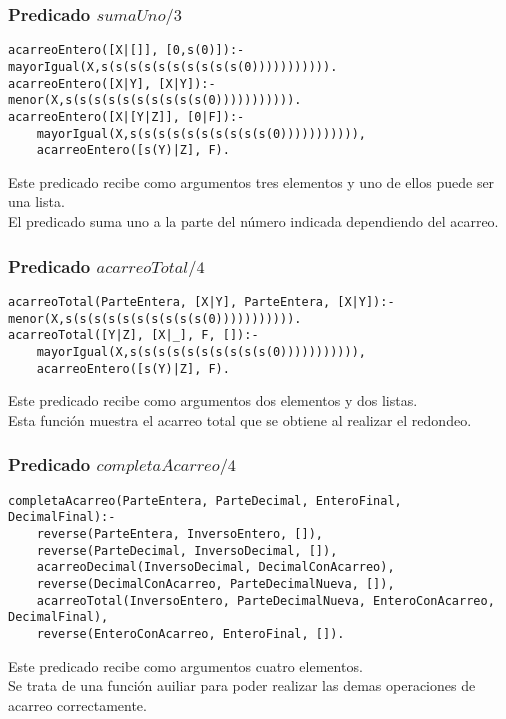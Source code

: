 \documentclass[11pt, a4paper]{article}
\begin{document}
\subsubsection{Predicado $sumaUno/3$}
\begin{lstlisting}[frame=single]
acarreoEntero([X|[]], [0,s(0)]):-mayorIgual(X,s(s(s(s(s(s(s(s(s(s(0))))))))))).
acarreoEntero([X|Y], [X|Y]):- menor(X,s(s(s(s(s(s(s(s(s(s(0))))))))))). 
acarreoEntero([X|[Y|Z]], [0|F]):-
    mayorIgual(X,s(s(s(s(s(s(s(s(s(s(0))))))))))),
    acarreoEntero([s(Y)|Z], F).
\end{lstlisting}
Este predicado recibe como argumentos tres elementos y uno de ellos puede ser una lista.\\
El predicado suma uno a la parte del número indicada dependiendo del acarreo.
\subsubsection{Predicado $acarreoTotal/4$}
\begin{lstlisting}[frame=single]
acarreoTotal(ParteEntera, [X|Y], ParteEntera, [X|Y]):- menor(X,s(s(s(s(s(s(s(s(s(s(0))))))))))).
acarreoTotal([Y|Z], [X|_], F, []):-
    mayorIgual(X,s(s(s(s(s(s(s(s(s(s(0))))))))))),
    acarreoEntero([s(Y)|Z], F).
\end{lstlisting}
Este predicado recibe como argumentos dos elementos y dos listas.\\
Esta función muestra el acarreo total que se obtiene al realizar el redondeo.
\subsubsection{Predicado $completaAcarreo/4$}
\begin{lstlisting}[frame=single]
completaAcarreo(ParteEntera, ParteDecimal, EnteroFinal, DecimalFinal):-
    reverse(ParteEntera, InversoEntero, []),
    reverse(ParteDecimal, InversoDecimal, []),
    acarreoDecimal(InversoDecimal, DecimalConAcarreo),
    reverse(DecimalConAcarreo, ParteDecimalNueva, []),
    acarreoTotal(InversoEntero, ParteDecimalNueva, EnteroConAcarreo, DecimalFinal),
    reverse(EnteroConAcarreo, EnteroFinal, []).
\end{lstlisting}
Este predicado recibe como argumentos cuatro elementos.\\
Se trata de una función auiliar para poder realizar las demas operaciones de acarreo correctamente.
\end{document}
